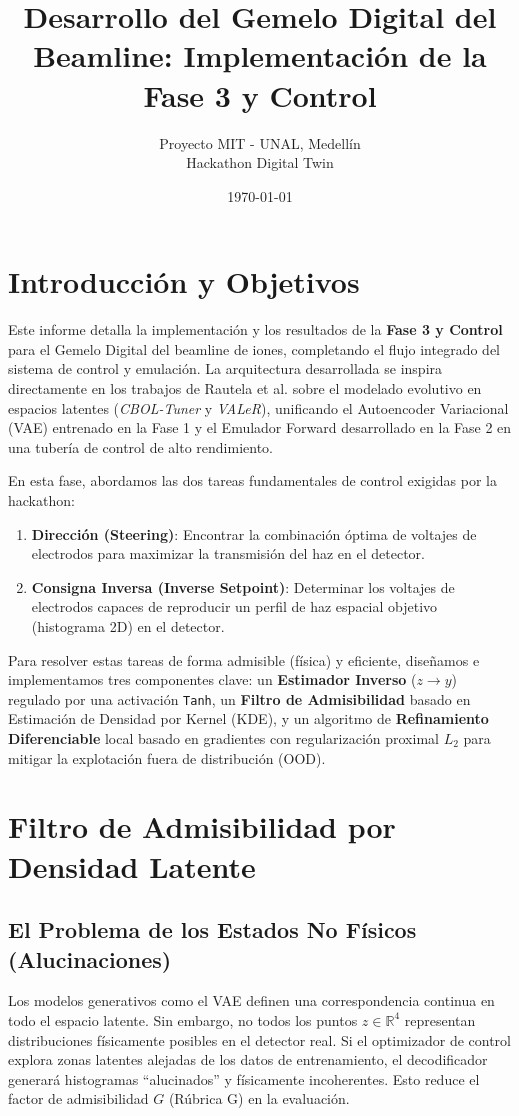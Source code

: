 \documentclass[12pt,letterpaper]{article}
\title{\textbf{Desarrollo del Gemelo Digital del Beamline: Implementación de la Fase 3 y Control}}
\author{Proyecto MIT - UNAL, Medellín \\ Hackathon Digital Twin}
\date{\today}
\begin{document}
\maketitle

\section{Introducción y Objetivos}
Este informe detalla la implementación y los resultados de la \textbf{Fase 3 y Control} para el Gemelo Digital del beamline de iones, completando el flujo integrado del sistema de control y emulación. La arquitectura desarrollada se inspira directamente en los trabajos de Rautela et al. sobre el modelado evolutivo en espacios latentes (\textit{CBOL-Tuner} y \textit{VALeR}), unificando el Autoencoder Variacional (VAE) entrenado en la Fase 1 y el Emulador Forward desarrollado en la Fase 2 en una tubería de control de alto rendimiento.

En esta fase, abordamos las dos tareas fundamentales de control exigidas por la hackathon:
\begin{enumerate}
    \item \textbf{Dirección (Steering)}: Encontrar la combinación óptima de voltajes de electrodos para maximizar la transmisión del haz en el detector.
    \item \textbf{Consigna Inversa (Inverse Setpoint)}: Determinar los voltajes de electrodos capaces de reproducir un perfil de haz espacial objetivo (histograma 2D) en el detector.
\end{enumerate}

Para resolver estas tareas de forma admisible (física) y eficiente, diseñamos e implementamos tres componentes clave: un \textbf{Estimador Inverso} ($z \rightarrow y$) regulado por una activación \texttt{Tanh}, un \textbf{Filtro de Admisibilidad} basado en Estimación de Densidad por Kernel (KDE), y un algoritmo de \textbf{Refinamiento Diferenciable} local basado en gradientes con regularización proximal $L_2$ para mitigar la explotación fuera de distribución (OOD).

\section{Filtro de Admisibilidad por Densidad Latente}
\label{sec:kde}
\subsection{El Problema de los Estados No Físicos (Alucinaciones)}
Los modelos generativos como el VAE definen una correspondencia continua en todo el espacio latente. Sin embargo, no todos los puntos $z \in \mathbb{R}^4$ representan distribuciones físicamente posibles en el detector real. Si el optimizador de control explora zonas latentes alejadas de los datos de entrenamiento, el decodificador generará histogramas ``alucinados'' y físicamente incoherentes. Esto reduce el factor de admisibilidad $G$ (Rúbrica G) en la evaluación.
\end{document}

